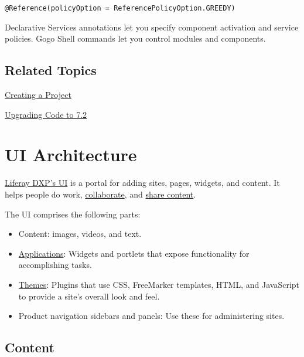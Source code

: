 \begin{verbatim}
@Reference(policyOption = ReferencePolicyOption.GREEDY)
\end{verbatim}

Declarative Services annotations let you specify component activation
and service policies. Gogo Shell commands let you control modules and
components.

\section{Related Topics}\label{related-topics-11}

\href{/docs/7-2/reference/-/knowledge_base/r/creating-a-project}{Creating
a Project}

\href{/docs/7-2/tutorials/-/knowledge_base/t/upgrading-code-to-product-ver}{Upgrading
Code to 7.2}

\chapter{UI Architecture}\label{ui-architecture}

\href{/docs/7-2/user/-/knowledge_base/u/the-liferay-distinction}{Liferay
DXP's UI} is a portal for adding sites, pages, widgets, and content. It
helps people do work,
\href{/docs/7-2/user/-/knowledge_base/u/collaboration}{collaborate}, and
\href{/docs/7-2/user/-/knowledge_base/u/web-experience-management}{share
content}.

The UI comprises the following parts:

\begin{itemize}
\item
  Content: images, videos, and text.
\item
  \href{/docs/7-2/appdev/-/knowledge_base/a/application-development}{Applications}:
  Widgets and portlets that expose functionality for accomplishing
  tasks.
\item
  \href{/docs/7-2/frameworks/-/knowledge_base/f/themes-introduction}{Themes}:
  Plugins that use CSS, FreeMarker templates, HTML, and JavaScript to
  provide a site's overall look and feel.
\item
  Product navigation sidebars and panels: Use these for administering
  sites.
\end{itemize}

\section{Content}\label{content}

